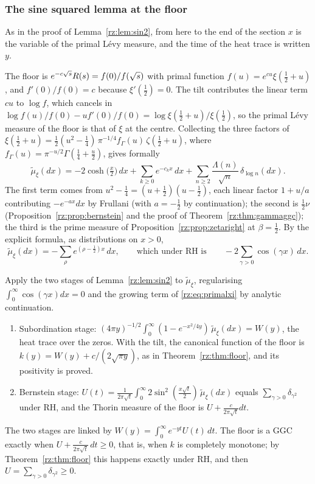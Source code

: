\subsubsection{The sine squared lemma at the floor}

As in the proof of Lemma~\ref{rz:lem:sin2}, from here to the end of the section $x$ is the variable of the primal L\'evy measure, and the time of the heat trace is written $y$.

The floor is $e^{-c\sqrt{s}}R(s)=f(0)/f(\sqrt{s})$ with primal function $f(u)=e^{cu}\xi(\frac12+u)$, and $f'(0)/f(0)=c$ because $\xi'(\frac12)=0$. The tilt contributes the linear term $cu$ to $\log f$, which cancels in $\log f(u)/f(0)-uf'(0)/f(0)=\log\xi(\frac12+u)/\xi(\frac12)$, so the primal L\'evy measure of the floor is that of $\xi$ at the centre. Collecting the three factors of $\xi(\frac12+u)=\frac12(u^2-\frac14)\,\pi^{-1/4}f_\Gamma(u)\,\zeta(\frac12+u)$, where $f_\Gamma(u)=\pi^{-u/2}\Gamma(\frac14+\frac u2)$, gives formally
\begin{equation}\label{rz:eq:primalxi}
\tilde\mu_\xi(dx)=-2\cosh\bigl(\tfrac x2\bigr)\,dx+\sum_{k\ge0}e^{-c_kx}\,dx+\sum_{n\ge2}\frac{\Lambda(n)}{\sqrt n}\,\delta_{\log n}(dx).
\end{equation}
The first term comes from $u^2-\frac14=(u+\frac12)(u-\frac12)$, each linear factor $1+u/a$ contributing $-e^{-ax}dx$ by Frullani (with $a=-\frac12$ by continuation); the second is $\frac12\nu$ (Proposition~\ref{rz:prop:bernstein} and the proof of Theorem~\ref{rz:thm:gammaggc}); the third is the prime measure of Proposition~\ref{rz:prop:zetaright} at $\beta=\frac12$. By the explicit formula, as distributions on $x>0$,
\begin{equation}\label{rz:eq:primalzeros}
\tilde\mu_\xi(dx)=-\sum_\rho e^{(\rho-\frac12)x}\,dx,\qquad\text{which under RH is}\qquad-2\sum_{\gamma>0}\cos(\gamma x)\,dx .
\end{equation}

\begin{proposition}\label{rz:prop:twostage}
Apply the two stages of Lemma~\ref{rz:lem:sin2} to $\tilde\mu_\xi$, regularising $\int_0^\infty\cos(\gamma x)dx=0$ and the growing term of \eqref{rz:eq:primalxi} by analytic continuation.
\begin{enumerate}
\item[(i)] Subordination stage: $(4\pi y)^{-1/2}\int_0^\infty(1-e^{-x^2/4y})\,\tilde\mu_\xi(dx)=W(y)$, the heat trace over the zeros. With the tilt, the canonical function of the floor is $k(y)=W(y)+c/(2\sqrt{\pi y})$, as in Theorem~\ref{rz:thm:floor}, and its positivity is proved.
\item[(ii)] Bernstein stage: $U(t)=\frac{1}{2\pi\sqrt t}\int_0^\infty2\sin^2(\frac{x\sqrt t}2)\,\tilde\mu_\xi(dx)$ equals $\sum_{\gamma>0}\delta_{\gamma^2}$ under RH, and the Thorin measure of the floor is $U+\frac{c}{2\pi\sqrt t}dt$.
\end{enumerate}
The two stages are linked by $W(y)=\int_0^\infty e^{-yt}U(t)\,dt$. The floor is a GGC exactly when $U+\frac{c}{2\pi\sqrt t}\,dt\ge0$, that is, when $k$ is completely monotone; by Theorem~\ref{rz:thm:floor} this happens exactly under RH, and then $U=\sum_{\gamma>0}\delta_{\gamma^2}\ge0$.
\end{proposition}

